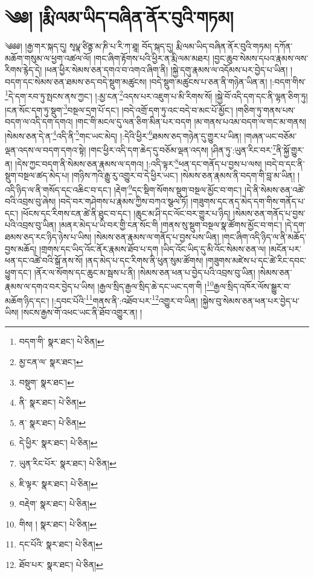 \setcounter{footnote}{0} 
\chapter{༄༅། །རྨི་ལམ་ཡིད་བཞིན་ནོར་བུའི་གཏམ།}༄༅༅། །རྒྱ་གར་སྐད་དུ། སྭཔྣ་ཙིནྟ་མ་ཎི་པ་རི་ཀ་ཐཱ། བོད་སྐད་དུ། རྨི་ལམ་ཡིད་བཞིན་ནོར་བུའི་གཏམ། དཀོན་མཆོག་གསུམ་ལ་ཕྱག་འཚལ་ལོ། །གང་ཞིག་རྟོགས་པའི་ཕྱིར་ན་རྨི་ལམ་མཐར། །བྱང་ཆུབ་སེམས་དཔའ་རྣམས་ལས་རིགས་རྙེད་དེ། །ཕན་ཕྱིར་སེམས་ཅན་དགའ་བ་འགའ་ཞིག་ནི། །སྐྱེ་དགུ་རྣམས་ལ་འདོམས་པར་བྱེད་པ་ཡིན། །བདག་དང་སེམས་ཅན་ཐམས་ཅད་བདེ་སྡུག་མཚུངས། །བདེ་སྡུག་མཚུངས་པ་ཅན་ནི་གཉེན་ཡིན་ན། །:བདག་གིས་\footnote{བདག་གི་  སྣར་ཐང་།  པེ་ཅིན། }དེ་དག་རབ་ཏུ་སྤངས་ནས་ཀྱང་། །:མྱ་ངན་\footnote{མྱ་ངན་ལ་  སྣར་ཐང་། }འདས་པར་འཇུག་པ་མི་རིགས་སོ། །སྐྱེ་བོ་འདི་དག་དང་ནི་ལྷན་ཅིག་ཏུ། །ངན་སོང་དག་ཏུ་སྡུག་\footnote{བསྡུག་  སྣར་ཐང་། }བསྔལ་དྲག་པོ་དང་། །བདེ་འགྲོ་དག་ཏུ་འང་བདེ་བ་མང་པོ་མྱོང་། །གཅིག་ཏུ་གནས་པས་བདག་ལ་འདི་དག་དགའ། །གང་གི་མངལ་དུ་ལན་ཅིག་མིན་པར་བདག །མ་གནས་པའམ་བདག་ལ་གང་མ་གནས། །སེམས་ཅན་དེ་ན་\footnote{ནི་  སྣར་ཐང་།  པེ་ཅིན། }འདི་ནི་\footnote{ན་  སྣར་ཐང་།  པེ་ཅིན། }གང་ཡང་མེད། །:དེའི་ཕྱིར་\footnote{དེ་ཕྱིར་  སྣར་ཐང་།  པེ་ཅིན། }ཐམས་ཅད་གཉེན་དུ་གྱུར་པ་ཡིན། །གཞན་ཡང་བཅོམ་ལྡན་འདས་ལ་བདག་དགའ་སྟེ། །གང་ཕྱིར་འདི་དག་ཆེད་དུ་བཅོམ་ལྡན་འདས། །ཤིན་ཏུ་:ཡུན་རིང་བར་\footnote{ཡུན་རིང་པོར་  སྣར་ཐང་།  པེ་ཅིན། }ནི་སྐྱོ་གྱུར་ན། །དེས་ཀྱང་བདག་ནི་སེམས་ཅན་རྣམས་ལ་དགའ། །:འདི་ལྟར་\footnote{ཇི་ལྟར་  སྣར་ཐང་།  པེ་ཅིན། }ཕན་དང་གནོད་པ་བྱས་པ་ལས། །བདེ་བ་དང་ནི་སྡུག་བསྔལ་ཚད་མེད་པ། །གཉིས་ཀའི་རྒྱུ་རུ་འགྱུར་བ་དེ་ཕྱིར་ཡང་། །སེམས་ཅན་རྣམས་ནི་བདག་གི་བླ་མ་ཡིན། །འདི་ཉིད་ལ་ནི་གསོད་དང་འཆིང་བ་དང་། །རྡེག་\footnote{བརྡེག་  སྣར་ཐང་།  པེ་ཅིན། }དང་སྡིག་སོགས་སྡུག་བསྔལ་མྱོང་བ་གང་། །དེ་ནི་སེམས་ཅན་འཚེ་བའི་འབྲས་བུ་ཞེས། །བདེ་བར་གཤེགས་པ་རྣམས་ཀྱིས་བཀའ་སྩལ་ཏོ། །གཟུགས་དང་ནད་མེད་དག་གིས་གནོད་པ་དང་། །ཕོངས་དང་རིགས་ངན་ཚེ་ནི་ཐུང་བ་དང་། །ཆུང་མ་ཤི་དང་ལོང་བར་གྱུར་པ་ཉིད། །སེམས་ཅན་གནོད་པ་བྱས་པའི་འབྲས་བུ་ཡིན། །མནར་མེད་པ་ཡི་བར་གྱི་ངན་སོང་གི །གནས་སུ་སྡུག་བསྔལ་སྣ་ཚོགས་མྱོང་བ་གང་། །དེ་དག་ཐམས་ཅད་རང་ཉིད་ཉེས་པ་ཡིས། །སེམས་ཅན་རྣམས་ལ་གནོད་པ་བྱས་པས་ཡིན། །གང་ཞིག་འདི་ཉིད་ལ་ནི་མཆོད་བྱས་མཆོད། །གྲགས་དང་ཡིད་འོང་ནོར་རྣམས་ཐོབ་པ་དག །ཡིད་འོང་ཡིད་དུ་མི་འོང་སེམས་ཅན་ལ། །མངོན་པར་ཕན་དང་འཚེ་བའི་སྒོ་ནས་སོ། །ནད་མེད་པ་དང་རིགས་ནི་ཕུན་སུམ་ཚོགས། །གཟུགས་མཛེས་པ་དང་ཚེ་རིང་དབང་ཕྱུག་དང་། །ནོར་ལ་སོགས་དང་ཆུང་མ་སྦས་པ་ནི། །སེམས་ཅན་ཕན་པ་བྱེད་པའི་འབྲས་བུ་ཡིན། །སེམས་ཅན་རྣམས་ལ་དགའ་བར་བྱེད་པ་ཡིས། །རྒྱལ་སྲིད་རྒྱལ་སྲིད་ཆེ་དང་ཡང་དག་གི །\footnote{གིས། །  སྣར་ཐང་།  པེ་ཅིན། }རྒྱལ་སྲིད་འཁོར་ལོས་སྒྱུར་བ་མཆོག་ཉིད་དང་། །:དབང་པོའི་\footnote{དང་པོའི་  སྣར་ཐང་།  པེ་ཅིན། }གནས་ནི་:འཐོབ་པར་\footnote{ཐོབ་པར་  སྣར་ཐང་།  པེ་ཅིན། }འགྱུར་བ་ཡིན། །སྐྱེས་བུ་སེམས་ཅན་ཕན་པར་བྱེད་པ་ཡིས། །སངས་རྒྱས་གོ་འཕང་ཡང་ནི་ཐོབ་འགྱུར་ན། །
